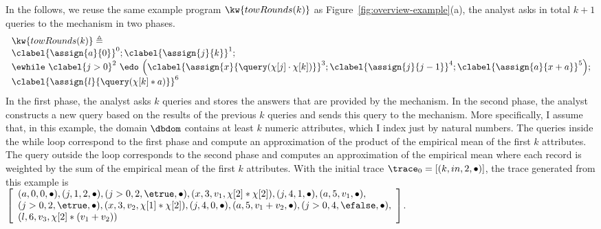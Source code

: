 \begin{example}
    In the follows, we reuse the same example program $\kw{towRounds(k)}$ as Figure~\ref{fig:overview-example}(a),
    the analyst asks in total $k+1$ queries to the mechanism in two phases.
    \[         \begin{array}{l}
      \kw{towRounds(k)} \triangleq \\
             \clabel{ \assign{a}{0}}^{0} ;
              \clabel{\assign{j}{k} }^{1} ;\\
              \ewhile ~ \clabel{j > 0}^{2} ~ \edo ~
              \Big(
               \clabel{\assign{x}{\query(\chi[j] \cdot \chi[k])} }^{3}  ;
               \clabel{\assign{j}{j-1}}^{4} ;
              \clabel{\assign{a}{x + a}}^{5}       \Big);\\
              \clabel{\assign{l}{\query(\chi[k]*a)} }^{6}
          \end{array}
          \]
    In the first phase, the analyst asks $k$ queries and stores the answers that are provided by the mechanism. 
    In the second phase, the analyst constructs a new query based on the results of the previous $k$ queries and sends this query to the mechanism. More specifically, I assume that, in this example, the domain $\dbdom$ 
    contains at least $k$ numeric attributes, which I index just by natural numbers. 
    The queries inside the while loop correspond to the first phase and compute an approximation of 
    the product of the empirical mean of the first $k$ attributes. 
    The query outside the loop corresponds to the second phase and computes an approximation of the empirical mean where each record is weighted by the sum of the empirical mean of the first $k$ attributes.
    With the initial trace
    $\trace_0 = [(k, in, 2, \bullet)]$,
    the trace generated from this example is 
   \\
    $
    \left[\begin{array}{l}
     (a, 0, 0, \bullet),
    (j, 1, 2, \bullet),
    (j>0, 2, \etrue, \bullet),
    (x, 3, v_1, \chi[2]*\chi[2]),
    (j, 4, 1, \bullet),
    (a, 5, v_1, \bullet),\\
    (j>0, 2, \etrue, \bullet),
    (x, 3, v_2, \chi[1]*\chi[2]),
    (j, 4, 0, \bullet),
    (a, 5, v_1 + v_2, \bullet),
    (j>0, 4, \efalse, \bullet),\\
    (l, 6, v_3, \chi[2]*( v_1 + v_2))
    \end{array} \right]
    $.
\end{example}
